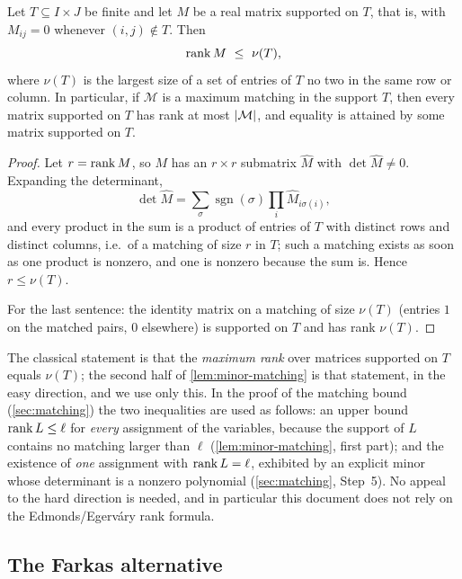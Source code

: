 \begin{lemma}\label{lem:minor-matching}
Let $T\subseteq I\times J$ be finite and let $M$ be a real matrix supported on $T$, that is, with
$M_{ij}=0$ whenever $(i,j)\notin T$. Then
\[
 \operatorname{rank} M\ \le\ \nu(T),
\]
where $\nu(T)$ is the largest size of a set of entries of $T$ no two in the same row or column.
In particular, if $\mathcal M$ is a maximum matching in the support $T$, then every matrix supported
on $T$ has rank at most $\lvert \mathcal M\rvert$, and equality is attained by some matrix supported
on $T$.
\end{lemma}

\begin{proof}
Let $r=\operatorname{rank} M$, so $M$ has an $r\times r$ submatrix $\widehat M$ with $\det\widehat M\ne0$. Expanding
the determinant,
\[
 \det\widehat M=\sum_{\sigma}\operatorname{sgn}(\sigma)\prod_{i}\widehat M_{i\sigma(i)},
\]
and every product in the sum is a product of entries of $T$ with distinct rows and distinct columns,
i.e.\ of a matching of size $r$ in $T$; such a matching exists as soon as one product is nonzero, and
one is nonzero because the sum is. Hence $r\le\nu(T)$.

For the last sentence: the identity matrix on a matching of size $\nu(T)$ (entries $1$ on the matched
pairs, $0$ elsewhere) is supported on $T$ and has rank $\nu(T)$.
\end{proof}

\begin{remark}\label{rem:no-edmonds}
The classical statement is that the \emph{maximum rank} over matrices supported on $T$ equals
$\nu(T)$; the second half of \cref{lem:minor-matching} is that statement, in the easy direction,
and we use only this. In the proof of the matching bound (\cref{sec:matching}) the two inequalities
are used as follows: an upper bound $\operatorname{rank} L\le\ell$ for \emph{every} assignment of the variables,
because the support of $L$ contains no matching larger than $\ell$ (\cref{lem:minor-matching},
first part); and the existence of \emph{one} assignment with $\operatorname{rank} L=\ell$, exhibited by an explicit
minor whose determinant is a nonzero polynomial (\cref{sec:matching}, Step~5). No appeal to the
hard direction is needed, and in particular this document does not rely on the
Edmonds/Egerv\'ary rank formula.
\end{remark}

\subsection{The Farkas alternative}\label{app:farkas}

